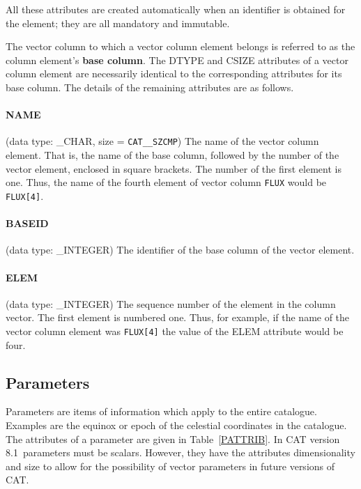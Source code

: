 \documentclass[11pt,twoside]{starlink}
\providecommand{\CATversion}{8.1~}
\begin{document}
All these attributes are created automatically when an identifier is
obtained for the element; they are all mandatory and immutable.

The vector column to which a vector column element belongs is
referred to as the column element's \textbf{base column}. The DTYPE and
CSIZE attributes of a vector column element are necessarily identical
to the corresponding attributes for its base column. The details of the
remaining attributes are as follows.

\paragraph{NAME}
(data type: \_CHAR, size = \texttt{CAT\_\_SZCMP})
The name of the vector column element. That is, the name of the base
column, followed by the number of the vector element, enclosed in
square brackets. The number of the first element is one. Thus, the name
of the fourth element of vector column \texttt{FLUX} would be \texttt{FLUX[4]}.

\paragraph{BASEID}
(data type: \_INTEGER)
The identifier of the base column of the vector element.

\paragraph{ELEM}
(data type: \_INTEGER)
The sequence number of the element in the column vector. The first
element is numbered one. Thus, for example, if the name of the vector
column element was \texttt{FLUX[4]} the value of the ELEM attribute
would be four.


\subsection{\label{PARS}Parameters}

Parameters are items of information which apply to the entire catalogue.
Examples are the equinox or epoch of the celestial coordinates in the
catalogue. The attributes of a parameter are given in
Table~\ref{PATTRIB}. In CAT version \CATversion parameters must be
scalars. However, they have the attributes dimensionality and size to
allow for the possibility of vector parameters in future versions of
CAT.
\end{document}
